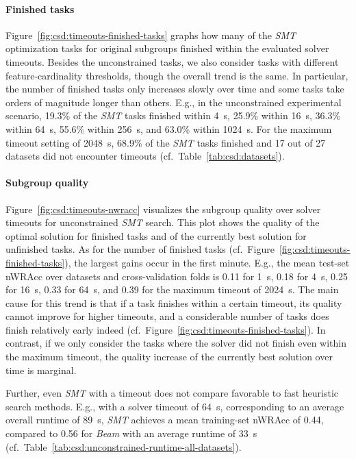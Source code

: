 \documentclass{article}
\theoremstyle{definition}
\begin{document}
\paragraph{Finished tasks}

Figure~\ref{fig:csd:timeouts-finished-tasks} graphs how many of the \emph{SMT} optimization tasks for original subgroups finished within the evaluated solver timeouts.
Besides the unconstrained tasks, we also consider tasks with different feature-cardinality thresholds, though the overall trend is the same.
In particular, the number of finished tasks only increases slowly over time and some tasks take orders of magnitude longer than others.
E.g., in the unconstrained experimental scenario, 19.3\% of the \emph{SMT} tasks finished within 4~s, 25.9\% within 16~s, 36.3\% within 64~s, 55.6\% within 256~s, and 63.0\% within 1024~s.
For the maximum timeout setting of 2048~s, 68.9\% of the \emph{SMT} tasks finished and 17 out of 27 datasets did not encounter timeouts (cf.~Table~\ref{tab:csd:datasets}).

\paragraph{Subgroup quality}

Figure~\ref{fig:csd:timeouts-nwracc} visualizes the subgroup quality over solver timeouts for unconstrained \emph{SMT} search.
This plot shows the quality of the optimal solution for finished tasks and of the currently best solution for unfinished tasks.
As for the number of finished tasks (cf.~Figure~\ref{fig:csd:timeouts-finished-tasks}), the largest gains occur in the first minute.
E.g., the mean test-set nWRAcc over datasets and cross-validation folds is 0.11 for 1~s, 0.18 for 4~s, 0.25 for 16~s, 0.33 for 64~s, and 0.39 for the maximum timeout of 2024~s.
The main cause for this trend is that if a task finishes within a certain timeout, its quality cannot improve for higher timeouts, and a considerable number of tasks does finish relatively early indeed (cf.~Figure~\ref{fig:csd:timeouts-finished-tasks}).
In contrast, if we only consider the tasks where the solver did not finish even within the maximum timeout, the quality increase of the currently best solution over time is marginal.

Further, even \emph{SMT} with a timeout does not compare favorable to fast heuristic search methods.
E.g., with a solver timeout of 64~s, corresponding to an average overall runtime of 89~s, \emph{SMT} achieves a mean training-set nWRAcc of 0.44, compared to 0.56 for \emph{Beam} with an average runtime of 33~s (cf.~Table~\ref{tab:csd:unconstrained-runtime-all-datasets}).
\end{document}
